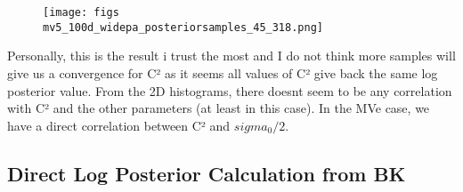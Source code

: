 \documentclass{article}
\begin{document}
\begin{figure}
\centering
\texttt{[image: figs\\mv5\_100d\_widepa\_posteriorsamples\_45\_318.png]}
\label{fig:mv5_100d_widepa_posteriorsamples_45_318}
\end{figure}

Personally, this is the result i trust the most and I do not think more samples will give us a convergence for C² as it seems all values of C² give back the same log posterior value. From the 2D histograms, there doesnt seem to be any correlation with C² and the other parameters (at least in this case). In the MVe case, we have a direct correlation between C² and $sigma_0/2$.

\subsection{Direct Log Posterior Calculation from BK}
\end{document}
